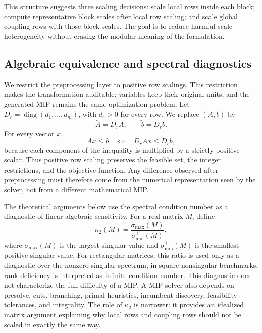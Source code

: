 \documentclass[AMA,Times1COL]{WileyNJDv5} %
\newcommand{\diag}{\operatorname{diag}}
\begin{document}
This structure suggests three scaling decisions: scale local rows inside each block; compute representative block scales after local row scaling; and scale global coupling rows with those block scales. The goal is to reduce harmful scale heterogeneity without erasing the modular meaning of the formulation.

\subsection{Algebraic equivalence and spectral diagnostics}
\label{subsec:equivalence-diagnostics}

We restrict the preprocessing layer to positive row scalings. This restriction makes the
transformation auditable: variables keep their original units, and the generated MIP remains
the same optimization problem. Let $D_r=\diag(d_1,\ldots,d_m)$, with $d_r>0$ for every
row. We replace $(A,b)$ by
\begin{equation}
\widetilde A = D_r A,
\qquad
\widetilde b = D_r b .
\label{eq:row-scaling}
\end{equation}
For every vector $x$,
\begin{equation}
Ax\le b
\quad\Longleftrightarrow\quad
D_rAx\le D_rb,
\label{eq:row-scaling-equivalence}
\end{equation}
because each component of the inequality is multiplied by a strictly positive scalar.
Thus positive row scaling preserves the feasible set, the integer restrictions, and the
objective function. Any difference observed after preprocessing must therefore come from
the numerical representation seen by the solver, not from a different mathematical MIP.

The theoretical arguments below use the spectral condition number as a diagnostic of linear-algebraic sensitivity. For a real matrix $M$, define
\begin{equation}
\kappa_2(M)=
\frac{\sigma_{\max}(M)}{\sigma_{\min}^{+}(M)},
\label{eq:spectral-condition}
\end{equation}
where $\sigma_{\max}(M)$ is the largest singular value and $\sigma_{\min}^{+}(M)$ is the
smallest positive singular value. For rectangular matrices, this ratio is used only as a
diagnostic over the nonzero singular spectrum; in square nonsingular benchmarks, rank
deficiency is interpreted as infinite condition number. This diagnostic does not characterize the full difficulty of a MIP. A MIP solver also depends on presolve, cuts, branching, primal heuristics, incumbent discovery, feasibility tolerances, and integrality. The role of $\kappa_2$ is narrower: it provides an idealized matrix argument explaining why local rows and coupling rows should not be scaled in exactly the same way.
\end{document}
